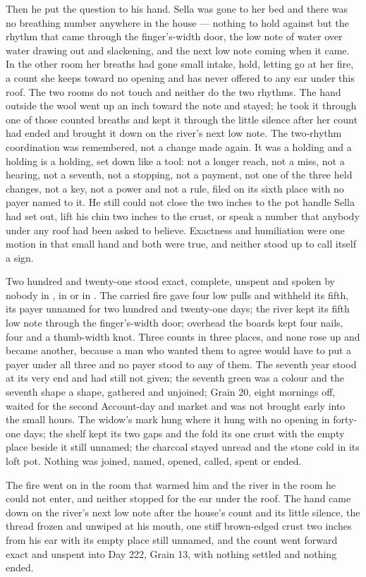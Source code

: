 Then he put the question to his hand. Sella was gone to her bed and there was no breathing number anywhere in the house --- nothing to hold against but the rhythm that came through the finger's-width door, the low note of water over water drawing out and slackening, and the next low note coming when it came. In the other room her breaths had gone small intake, hold, letting go at her fire, a count she keeps toward no opening and has never offered to any ear under this roof. The two rooms do not touch and neither do the two rhythms. The hand outside the wool went up an inch toward the note and stayed; he took it through one of those counted breaths and kept it through the little silence after her count had ended and brought it down on the river's next low note. The two-rhythm coordination was remembered, not a change made again. It was a holding and a holding is a holding, set down like a tool: not a longer reach, not a miss, not a hearing, not a seventh, not a stopping, not a payment, not one of the three held changes, not a key, not a power and not a rule, filed on its sixth place with no payer named to it. He still could not close the two inches to the pot handle Sella had set out, lift his chin two inches to the crust, or speak a number that anybody under any roof had been asked to believe. Exactness and humiliation were one motion in that small hand and both were true, and neither stood up to call itself a sign.

Two hundred and twenty-one stood exact, complete, unspent and spoken by nobody in , in  or in . The carried fire gave four low pulls and withheld its fifth, its payer unnamed for two hundred and twenty-one days; the river kept its fifth low note through the finger's-width door; overhead the boards kept four nails, four and a thumb-width knot. Three counts in three places, and none rose up and became another, because a man who wanted them to agree would have to put a payer under all three and no payer stood to any of them. The seventh year stood at its very end and had still not given; the seventh green was a colour and the seventh shape a shape, gathered and unjoined; Grain 20, eight mornings off, waited for the second Account-day and market and was not brought early into the small hours. The widow's mark hung where it hung with no opening in forty-one days; the shelf kept its two gaps and the fold its one crust with the empty place beside it still unnamed; the charcoal stayed unread and the stone cold in its loft pot. Nothing was joined, named, opened, called, spent or ended.

The fire went on in the room that warmed him and the river in the room he could not enter, and neither stopped for the ear under the roof. The hand came down on the river's next low note after the house's count and its little silence, the thread frozen and unwiped at his mouth, one stiff brown-edged crust two inches from his ear with its empty place still unnamed, and the count went forward exact and unspent into Day 222, Grain 13, with nothing settled and nothing ended.
